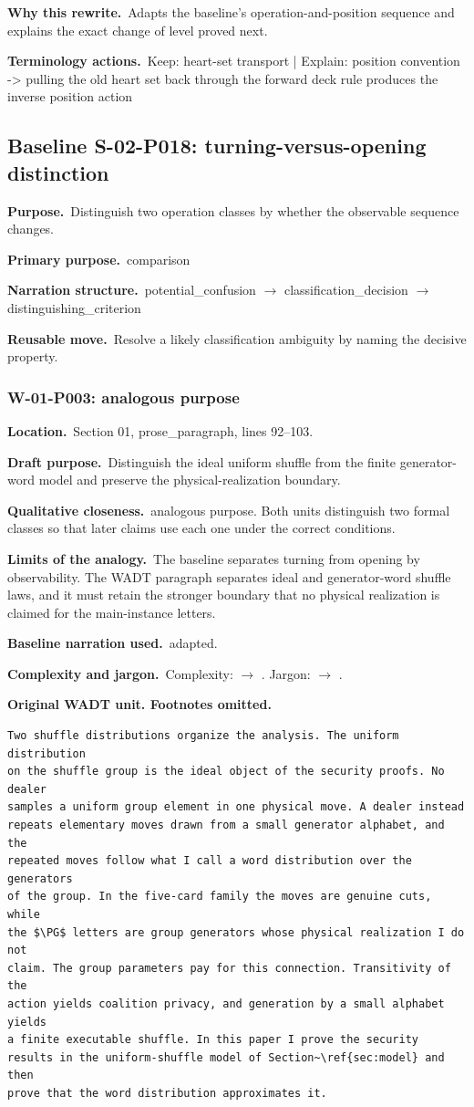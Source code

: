 \documentclass[10pt]{article}
\newcommand{\Field}[2]{\textbf{#1}\ #2\par}\newcommand{\Tag}[1]{\fcolorbox{black!25}{black!4}{\strut\scriptsize #1}}
\begin{document}
\Field{Why this rewrite.}{Adapts the baseline's operation-and-position sequence and explains the exact change of level proved next.}
\Field{Terminology actions.}{Keep: heart-set transport | Explain: position convention -> pulling the old heart set back through the forward deck rule produces the inverse position action}
\par\smallskip
\clearpage\subsection{Baseline S-02-P018: turning-versus-opening distinction}
\colorbox{BaselineBlue}{\parbox{0.97\textwidth}{\Field{Purpose.}{Distinguish two operation classes by whether the observable sequence changes.}\Field{Primary purpose.}{comparison}\Field{Narration structure.}{potential\_confusion $\rightarrow$ classification\_decision $\rightarrow$ distinguishing\_criterion}\Field{Reusable move.}{Resolve a likely classification ambiguity by naming the decisive property.}}}
\subsubsection*{W-01-P003: analogous purpose}
\Field{Location.}{Section 01, prose\_paragraph, lines 92--103.}
\Field{Draft purpose.}{Distinguish the ideal uniform shuffle from the finite generator-word model and preserve the physical-realization boundary.}
\Field{Qualitative closeness.}{analogous purpose. Both units distinguish two formal classes so that later claims use each one under the correct conditions.}
\Field{Limits of the analogy.}{The baseline separates turning from opening by observability. The WADT paragraph separates ideal and generator-word shuffle laws, and it must retain the stronger boundary that no physical realization is claimed for the main-instance letters.}
\Field{Baseline narration used.}{adapted.}
\Field{Complexity and jargon.}{Complexity: \Tag{high} $\rightarrow$ \Tag{medium}. Jargon: \Tag{high} $\rightarrow$ \Tag{medium}.}
\textbf{Original WADT unit. Footnotes omitted.}
\begin{lstlisting}
Two shuffle distributions organize the analysis. The uniform distribution
on the shuffle group is the ideal object of the security proofs. No dealer
samples a uniform group element in one physical move. A dealer instead
repeats elementary moves drawn from a small generator alphabet, and the
repeated moves follow what I call a word distribution over the generators
of the group. In the five-card family the moves are genuine cuts, while
the $\PG$ letters are group generators whose physical realization I do not
claim. The group parameters pay for this connection. Transitivity of the
action yields coalition privacy, and generation by a small alphabet yields
a finite executable shuffle. In this paper I prove the security results in the uniform-shuffle model of Section~\ref{sec:model} and then
prove that the word distribution approximates it.
\end{lstlisting}
\end{document}
